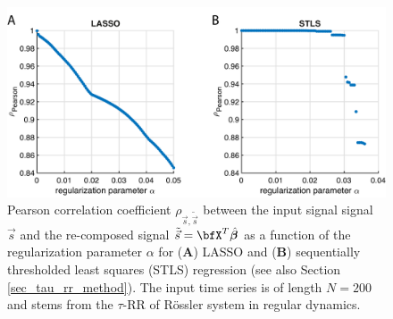 \documentclass[entropy,article,accept,pdftex,moreauthors]{Definitions/mdpi}
\begin{document}
\begin{figure}[H]
 \centering
 \includegraphics[width=\textwidth]{./figures/fig_regularization}
 \caption{Pearson correlation coefficient $\rho_{\vec{s},\tilde{\vec{s}}}$ between the input signal signal $\vec{s}$ and the re-composed signal $\tilde{\vec{s}}=\bfX^T\hat{\boldsymbol\beta}$ as a 
 function of the regularization parameter $\alpha$ for (\textbf{A}) LASSO and (\textbf{B}) sequentially thresholded least squares (STLS) regression (see also Section \ref{sec_tau_rr_method}). 
 The input time series is of length $N=200$ and stems from the $\tau$-RR of R\"ossler system in regular dynamics.}
\label{fig_regularization}
\end{figure}
\end{document}
